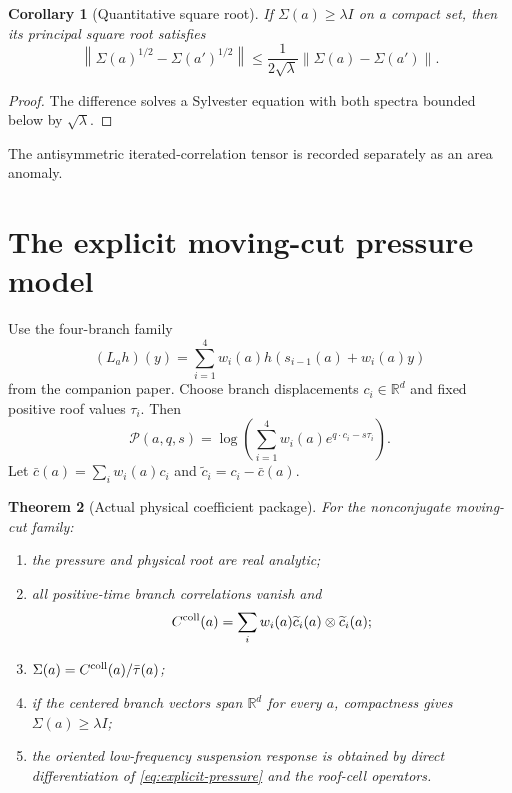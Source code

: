 \documentclass[11pt,reqno]{amsart}
\newtheorem{theorem}{Theorem}[section]
\newtheorem{corollary}[theorem]{Corollary}
\theoremstyle{definition}
\theoremstyle{remark}
\newcommand{\R}{\mathbb R}
\newcommand{\norm}[1]{\left\lVert #1\right\rVert}
\begin{document}
\begin{corollary}[Quantitative square root]\label{cor:sqrt}
If $\Sigma(a)\ge\lambda I$ on a compact set, then its principal square root
satisfies
\[
 \norm{\Sigma(a)^{1/2}-\Sigma(a')^{1/2}}
 \le\frac1{2\sqrt\lambda}
 \norm{\Sigma(a)-\Sigma(a')}.
\]
\end{corollary}

\begin{proof}
The difference solves a Sylvester equation with both spectra bounded below by
$\sqrt\lambda$.
\end{proof}

The antisymmetric iterated-correlation tensor is recorded separately as an
area anomaly.

\section{The explicit moving-cut pressure model}\label{sec:explicit}

Use the four-branch family
\[
 (L_ah)(y)=\sum_{i=1}^4w_i(a)
 h(s_{i-1}(a)+w_i(a)y)
\]
from the companion paper.  Choose branch displacements $c_i\in\R^d$ and fixed
positive roof values $\tau_i$.  Then
\begin{equation}\label{eq:explicit-pressure}
 \mathscr P(a,q,s)=
 \log\left(\sum_{i=1}^4w_i(a)e^{q\cdot c_i-s\tau_i}\right).
\end{equation}
Let $\bar c(a)=\sum_iw_i(a)c_i$ and
$\widetilde c_i=c_i-\bar c(a)$.

\begin{theorem}[Actual physical coefficient package]\label{thm:actual-low}
For the nonconjugate moving-cut family:
\begin{enumerate}[label=(\roman*)]
\item the pressure and physical root are real analytic;
\item all positive-time branch correlations vanish and
\[
 C^{\rm coll}(a)=\sum_iw_i(a)
 \widetilde c_i(a)\otimes\widetilde c_i(a);
\]
\item $\Sigma(a)=C^{\rm coll}(a)/\bar\tau(a)$;
\item if the centered branch vectors span $\R^d$ for every $a$, compactness
gives $\Sigma(a)\ge\lambda I$;
\item the oriented low-frequency suspension response is obtained by direct
differentiation of \eqref{eq:explicit-pressure} and the roof-cell operators.
\end{enumerate}
\end{theorem}
\end{document}
